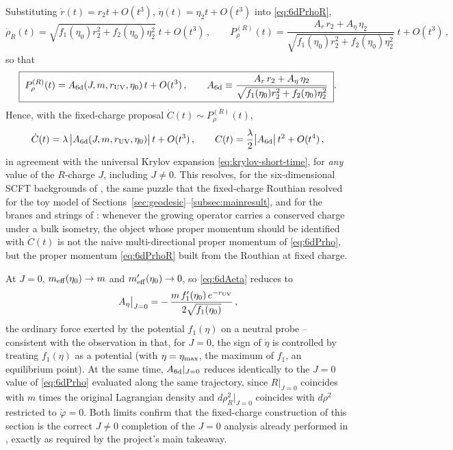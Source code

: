 \documentclass[11pt]{article}
\begin{document}
Substituting $\dot r(t)=r_2t+O(t^3)$, $\dot\eta(t)=\eta_2t+O(t^3)$ into \eqref{eq:6dPrhoR},
\begin{equation}
\dot\rho_R(t) = \sqrt{f_1(\eta_0)r_2^2+f_2(\eta_0)\eta_2^2}\;t+O(t^3)\,,
\qquad
P_\rho^{(R)}(t) = \frac{A_r\,r_2+A_\eta\,\eta_2}{\sqrt{f_1(\eta_0)r_2^2+f_2(\eta_0)\eta_2^2}}\;t+O(t^3)\,,
\end{equation}
so that
\begin{equation}
\boxed{\;
P_\rho^{(R)}(t) = A_{\rm 6d}(J,m,r_{\rm UV},\eta_0)\,t+O(t^3)\,,
\qquad
A_{\rm 6d}\equiv \frac{A_r\,r_2+A_\eta\,\eta_2}{\sqrt{f_1(\eta_0)r_2^2+f_2(\eta_0)\eta_2^2}}\;}.
\label{eq:6dAlin}
\end{equation}
Hence, with the fixed-charge proposal $\dot C(t)\sim P_\rho^{(R)}(t)$,
\begin{equation}
\dot C(t)=\lambda\,\big|A_{\rm 6d}(J,m,r_{\rm UV},\eta_0)\big|\,t+O(t^3)\,,
\qquad
C(t) = \frac{\lambda}{2}\big|A_{\rm 6d}\big|\,t^2+O(t^4)\,,
\end{equation}
in agreement with the universal Krylov expansion \eqref{eq:krylov-short-time}, for \emph{any} value of the $R$-charge $J$, including $J\neq0$. This resolves, for the six-dimensional SCFT backgrounds of \cite{Fatemiabhari:2026rob}, the same puzzle that the fixed-charge Routhian resolved for the toy model of Sections~\ref{sec:geodesic}--\ref{subsec:mainresult}, and for the branes and strings of \cite{Chatzis:2026ekd}: whenever the growing operator carries a conserved charge under a bulk isometry, the object whose proper momentum should be identified with $\dot C(t)$ is not the naive multi-directional proper momentum of \eqref{eq:6dPrho}, but the proper momentum \eqref{eq:6dPrhoR} built from the Routhian at fixed charge.

At $J=0$, $m_{\rm eff}(\eta_0)\to m$ and $m_{\rm eff}'(\eta_0)\to0$, so \eqref{eq:6dAeta} reduces to
\begin{equation}
A_\eta\big|_{J=0}=-\,\frac{m\,f_1'(\eta_0)\,e^{-r_{\rm UV}}}{2\sqrt{f_1(\eta_0)}}\,,
\end{equation}
the ordinary force exerted by the potential $f_1(\eta)$ on a neutral probe -- consistent with the observation in \cite{Fatemiabhari:2026rob} that, for $J=0$, the sign of $\dot\eta$ is controlled by treating $f_1(\eta)$ as a potential (with $\eta=\eta_{\rm max}$, the maximum of $f_1$, an equilibrium point). At the same time, $A_{\rm 6d}|_{J=0}$ reduces identically to the $J=0$ value of \eqref{eq:6dPrho} evaluated along the same trajectory, since $R|_{J=0}$ coincides with $m$ times the original Lagrangian density and $d\rho_R^2|_{J=0}$ coincides with $d\rho^2$ restricted to $\dot\varphi=0$. Both limits confirm that the fixed-charge construction of this section is the correct $J\neq0$ completion of the $J=0$ analysis already performed in \cite{Fatemiabhari:2026rob}, exactly as required by the project's main takeaway.
\end{document}
